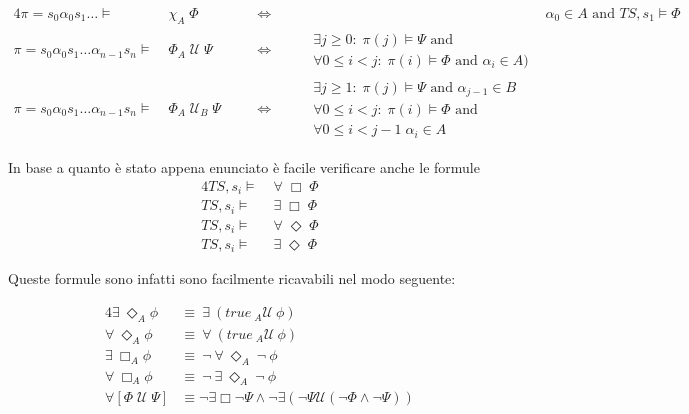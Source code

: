 \begin{alignat}{4}
\pi = s_0 \alpha_0 s_1 \dots  \models & \; \chi_A \; \Phi 								&& \quad \Leftrightarrow \quad &&  	\alpha_0 \in A \text{ and } TS,s_1 \models \Phi \\
\pi =  s_0 \alpha_0 s_1 	 \dots \alpha_{n-1} s_n \models & \; \Phi_A \; \mathcal{U} \;  \Psi		&& \quad \Leftrightarrow \quad & \begin{split} & \exists j \ge 0: \; \pi(j) \models \Psi \text{ and } \\ &  \forall 0 \le i < j:  \; \pi(i) \models \Phi \text{ and }  \alpha_i \in A )\end{split} \\
\pi =  s_0 \alpha_0 s_1 	 \dots \alpha_{n-1} s_n \models & \; \Phi_A \; \mathcal{U}_B \;  \Psi	&& \quad \Leftrightarrow \quad & \begin{split} & \exists j \ge 1: \; \pi(j) \models \Psi \text{ and } \alpha_{j-1} \in B \\ &  \forall 0 \le i < j:  \; \pi(i) \models \Phi \text{ and } \\ &  \forall 0 \le i < j-1 \; \alpha_i \in A \end{split} 
\end{alignat}

In base a quanto è stato appena enunciato è facile verificare anche le formule 
\begin{alignat}{4}
TS, s_i \models & \; \forall \; \Box \; \Phi \\
TS, s_i \models & \; \exists \; \Box \; \Phi \\
TS, s_i \models  & \; \forall \; \Diamond \; \Phi \\
TS, s_i \models & \; \exists \; \Diamond	\; \Phi	 
\end{alignat}

Queste formule sono infatti sono facilmente ricavabili nel modo seguente:

\begin{alignat}{4}
\exists\ \Diamond_A \phi\ 			&\equiv\ \exists\ (true\ {}_{A}\mathcal{U}\ \phi ) \\ 
\forall\ \Diamond_A \phi\ 			&\equiv\ \forall\ (true\ {}_{A}\mathcal{U}\ \phi ) \\
\exists\ \Box_A \phi\			&\equiv\ \neg\ \forall\ \Diamond_A\ \neg\ \phi \\
\forall\ \Box_A \phi\ 			&\equiv\ \neg\ \exists\ \Diamond_A\ \neg\ \phi  \\
\forall [ \Phi \; \mathcal{U} \; \Psi ] 	&\equiv \neg \exists \Box \neg \Psi \wedge \neg \exists (\neg \Psi \mathcal{U} (\neg \Phi \wedge \neg \Psi))
\end{alignat}